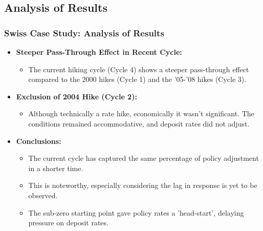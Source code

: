 \documentclass{beamer}
\begin{document}
\subsection{Analysis of Results}
\begin{frame}
\frametitle{Swiss Case Study: Analysis of Results}
\begin{itemize}
    \item \textbf{Steeper Pass-Through Effect in Recent Cycle:}
    \begin{itemize}
        \item The current hiking cycle (Cycle 4) shows a steeper pass-through effect compared to the 2000 hikes (Cycle 1) and the '05-'08 hikes (Cycle 3).
    \end{itemize}
        \item \textbf{Exclusion of 2004 Hike (Cycle 2):}
    \begin{itemize}
        \item Although technically a rate hike, economically it wasn't significant. The conditions remained accommodative, and deposit rates did not adjust.
    \end{itemize}
        \item \textbf{Conclusions:}
    \begin{itemize}
        \item The current cycle has captured the same percentage of policy adjustment in a shorter time.
        \item This is noteworthy, especially considering the lag in response is yet to be observed.
        \item The sub-zero starting point gave policy rates a 'head-start', delaying pressure on deposit rates.
    \end{itemize}
\end{itemize}
\end{frame}
\end{document}
